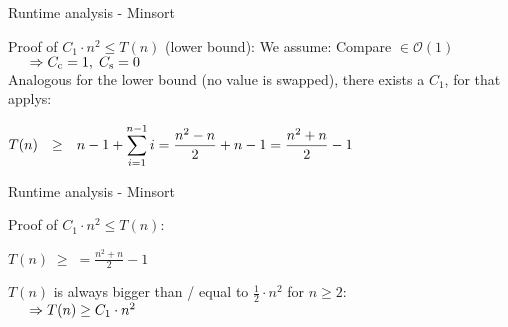 
\begin{frame}{Runtime analysis - Minsort}
  \begin{block}{Proof of $C_1 \cdot n^2 \leq T(n)$
      ({\color{Mittel-Gruen}lower bound}):}
    We assume: Compare $\in \mathcal{O}(1)$\\
    $\hspace{1.5em}\Rightarrow C_\text{c} = 1, \; C_\text{s} = 0$\\
    \vspace*{0.5em}
    Analogous for the {\color{Mittel-Gruen}lower bound}
    (no value is swapped), there exists a $C_1$, for that
    applys:\\[0.5em]
    \begin{centering}
      \begin{math}
        \begin{array}{@{}rcl@{}}
          T(n) & \geq &
          \displaystyle
          n - 1 + \sum^{n - 1}_{i=1} i
          = \frac{n^2 - n}{2} + n - 1
          = \frac{n^2 + n}{2} - 1
        \end{array}
      \end{math}
    \end{centering}
  \end{block}
\end{frame}


\begin{frame}{Runtime analysis - Minsort}
  \begin{block}{Proof of $C_1 \cdot n^2 \leq T(n)$:}
    \vspace*{0.5em}
    \begin{center}
      $\displaystyle
        T(n) \; \geq \;
          = \frac{n^2 + n}{2} - 1
      $\\
    \end{center}
    $T(n)$ is always bigger than / equal to $\frac{1}{2} \cdot n^2$
    for $n \geq 2$:\\[1.0em]
    $\hspace*{1.5em}\Rightarrow T(n) \geq C_1 \cdot n^2$
  \end{block}
\end{frame}



